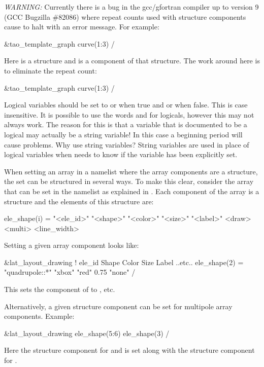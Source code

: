 {\em WARNING:} Currently there is a bug in the gcc/gfortran compiler up to version 9 (GCC Bugzilla
\#82086) where repeat counts used with structure components cause \tao to halt with an error
message. For example:
\begin{example}
  &tao_template_graph
    curve(1:3)%
  /
\end{example}
Here  is a structure and  is a component of that structure. The
work around here is to eliminate the repeat count:
\begin{example}
  &tao_template_graph
    curve(1:3)%
  /
\end{example}

Logical variables should be set to  or  when true and  or  when
false. This is case insensitive. It is possible to use the words  and  for
logicals, however this may not always work. The reason for this is that a variable that is
documented to be a logical may actually be a string variable! In this case a beginning period will
cause problems. Why use string variables? String variables are used in place of logical variables
when \tao needs to know if the variable has been explicitly set.

When setting an array in a namelist where the array components are a structure, the set can be
structured in several ways. To make this clear, consider the  array that can be set
in the  namelist as explained in . Each component
of the  array is a structure and the elements of this structure are:
\begin{example}
  ele_shape(i) = "<ele_id>" "<shape>" "<color>" "<size>" "<label>" <draw> <multi> <line_width>
\end{example}
Setting a given  array component looks like:
\begin{example}
  &lat_layout_drawing
    !               ele_id                  Shape      Color     Size  Label  ..etc..
    ele_shape(2) = "quadrupole::*"          "xbox"     "red"     0.75  "none" 
  /
\end{example}
This sets the  component of  to , etc.

Alternatively, a given structure component can be set for multipole array components. Example:
\begin{example}
  &lat_layout_drawing
    ele_shape(5:6)%
    ele_shape(3)%
  /
\end{example}
Here the  structure component for  and  is set along
with the  structure component for .

